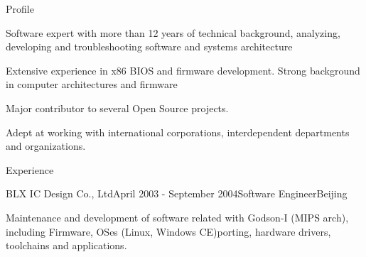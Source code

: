 \documentclass{resume} %
\begin{document}

\begin{rSection}{Profile}

\item Software expert with more than 12 years of technical background, analyzing, developing and troubleshooting software and systems architecture
\item Extensive experience in x86 BIOS and firmware development. Strong background in computer architectures and firmware
\item Major contributor to several Open Source projects.
\item Adept at working with international corporations, interdependent departments and organizations.

\end{rSection}



\begin{rSection}{Experience}



\begin{rSubsection}{BLX IC Design Co., Ltd}{April 2003 - September 2004}{Software Engineer}{Beijing}
\item Maintenance and development of software related with Godson-I (MIPS arch), including Firmware, OSes
         (Linux, Windows CE)porting, hardware drivers, toolchains and applications.
\item
\end{rSubsection}


\end{rSection}
\end{document}
